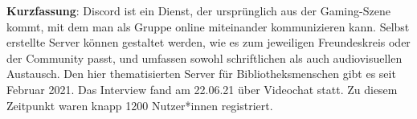 \textbf{Kurzfassung}: Discord ist ein Dienst, der ursprünglich aus der
Gaming-Szene kommt, mit dem man als Gruppe online miteinander
kommunizieren kann. Selbst erstellte Server können gestaltet werden, wie
es zum jeweiligen Freundeskreis oder der Community passt, und umfassen
sowohl schriftlichen als auch audiovisuellen Austausch. Den hier
thematisierten Server für Bibliotheksmenschen gibt es seit Februar 2021.
Das Interview fand am 22.06.21 über Videochat statt. Zu diesem Zeitpunkt
waren knapp 1200 Nutzer*innen registriert.
